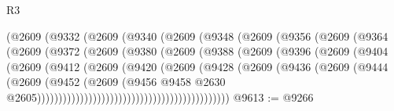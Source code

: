 \begin{lexlean}{R3}
\begin{coremodule}
                          (@2609
                            (@9332
                              (@2609
                                (@9340
                                  (@2609
                                    (@9348
                                      (@2609
                                        (@9356
                                          (@2609
                                            (@9364
                                              (@2609
                                                (@9372
                                                  (@2609
                                                    (@9380
                                                      (@2609
                                                        (@9388
                                                          (@2609
                                                            (@9396
                                                              (@2609
                                                                (@9404
                                                                  (@2609
                                                                    (@9412
                                                                      (@2609
                                                                        (@9420
                                                                          (@2609
                                                                            (@9428
                                                                              (@2609
                                                                                (@9436
                                                                                  (@2609
                                                                                    (@9444
                                                                                      (@2609
                                                                                        (@9452
                                                                                          (@2609
                                                                                            (@9456
                                                                                              @9458
                                                                                              @2630
                                                                                              @2605)))))))))))))))))))))))))))))))))))))))))))))
@9613 := @9266

\end{coremodule}
\end{lexlean}
